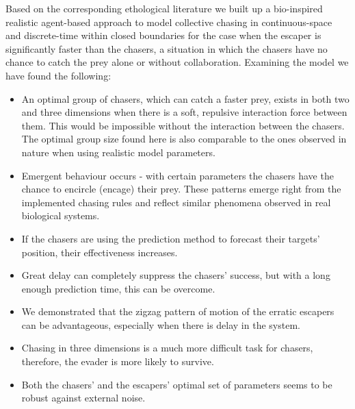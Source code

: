 \documentclass[12pt,a4paper,final]{iopart}
\begin{document}
Based on the corresponding ethological literature we built up a bio-inspired realistic agent-based approach to model collective chasing in continuous-space and discrete-time within closed boundaries for the case when the escaper is significantly faster than the chasers, a situation in which the chasers have no chance to catch the prey alone or without collaboration. Examining the model we have found the following:
\begin{itemize}
\item An optimal group of chasers, which can catch a faster prey, exists in both two and three dimensions when there is a soft, repulsive interaction force between them. This would be impossible without the interaction between the chasers. The optimal group size found here is also comparable to the ones observed in nature when using realistic model parameters.
\item Emergent behaviour occurs - with certain parameters the chasers have the chance to encircle (encage) their prey. These patterns emerge right from the implemented chasing rules  and reflect similar phenomena observed in real biological systems.
\item If the chasers are using the prediction method to forecast their targets' position, their effectiveness increases. 
\item Great delay can completely suppress the chasers' success, but with a long enough prediction time, this can be overcome. 
\item We demonstrated that the zigzag pattern of motion of the erratic escapers can be advantageous, especially when there is delay in the system.
\item Chasing in three dimensions is a much more difficult task for chasers, therefore, the
evader is more likely to survive. 
\item Both the chasers' and the escapers' optimal set of parameters seems to be robust against external noise.
\end{itemize}








\end{document}
